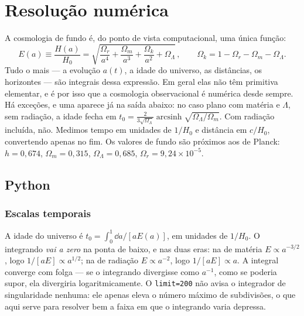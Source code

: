 \section{Resolução numérica}
\label{sec:cap12-numerica}

A cosmologia de fundo é, do ponto de vista computacional, uma única função:
\begin{equation}
  E(a) \equiv \frac{H(a)}{H_{0}}
  = \sqrt{\frac{\Omega_{r}}{a^{4}} + \frac{\Omega_{m}}{a^{3}}
          + \frac{\Omega_{k}}{a^{2}} + \Omega_{\Lambda}}\,,
  \qquad
  \Omega_{k} = 1 - \Omega_{r} - \Omega_{m} - \Omega_{\Lambda}.
  \label{eq:cap13-E}
\end{equation}
Tudo o mais --- a evolução $a(t)$, a idade do universo, as distâncias, os
horizontes --- são integrais dessa expressão. Em geral elas não têm primitiva
elementar, e é por isso que a cosmologia observacional é numérica desde
sempre. Há exceções, e uma aparece já na saída abaixo: no caso plano com
matéria e $\Lambda$, sem radiação, a idade fecha em
$t_{0}=\tfrac{2}{3\sqrt{\Omega_{\Lambda}}}
\operatorname{arcsinh}\sqrt{\Omega_{\Lambda}/\Omega_{m}}$. Com radiação
incluída, não. Medimos tempo em unidades
de $1/H_{0}$ e distância em $c/H_{0}$, convertendo apenas no fim. Os valores
de fundo são próximos aos de Planck: $h = 0{,}674$, $\Omega_{m} = 0{,}315$,
$\Omega_{\Lambda} = 0{,}685$, $\Omega_{r} = 9{,}24\times 10^{-5}$.

\subsection{Python}


\subsubsection*{Escalas temporais}

A idade do universo é $t_{0} = \int_{0}^{1} \dd a/[a E(a)]$, em unidades de
$1/H_{0}$. O integrando \emph{vai a zero} na ponta de baixo, e nas duas eras:
na de matéria $E \propto a^{-3/2}$, logo $1/[aE] \propto a^{1/2}$; na de
radiação $E \propto a^{-2}$, logo $1/[aE] \propto a$. A integral converge com
folga --- se o integrando divergisse como $a^{-1}$, como se poderia supor, ela
divergiria logaritmicamente. O \texttt{limit=200} não avisa o integrador de
singularidade nenhuma: ele apenas eleva o número máximo de subdivisões, o que
aqui serve para resolver bem a faixa em que o integrando varia depressa.

